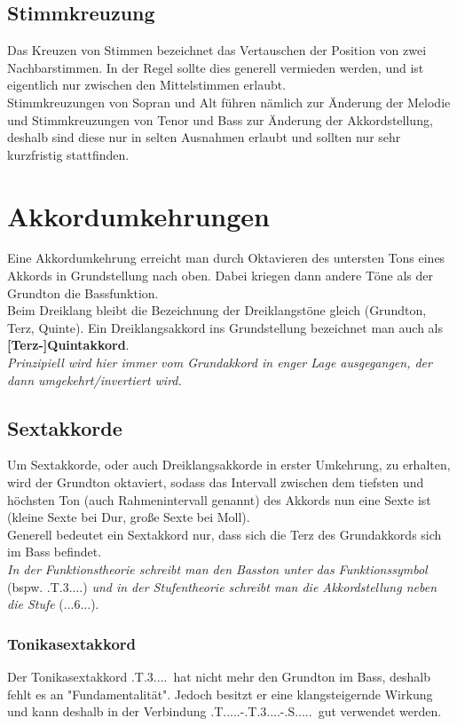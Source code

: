 \documentclass[a4paper]{article}
\newcommand{\dSS}[1]{\HH.\uppercase\expandafter{\romannumeral #1\relax}..6...} %
\newcommand{\T}{\HH.T.....}
\newcommand{\TS}{\HH.T.3....}
\renewcommand{\S}{\HH.S.....}
\begin{document}
	\subsection{Stimmkreuzung}
	Das Kreuzen von Stimmen bezeichnet das Vertauschen der Position von zwei Nachbarstimmen. In der Regel sollte dies generell vermieden werden, und ist eigentlich nur zwischen den Mittelstimmen erlaubt. \\
	Stimmkreuzungen von Sopran und Alt führen nämlich zur Änderung der Melodie und Stimmkreuzungen von Tenor und Bass zur Änderung der Akkordstellung, deshalb sind diese nur in selten Ausnahmen erlaubt und sollten nur sehr kurzfristig stattfinden.
	
	\section{Akkordumkehrungen}
	Eine Akkordumkehrung erreicht man durch Oktavieren des untersten Tons eines Akkords in Grundstellung nach oben. Dabei kriegen dann andere Töne als der Grundton die Bassfunktion.\\
	Beim Dreiklang bleibt die Bezeichnung der Dreiklangstöne gleich (Grundton, Terz, Quinte). Ein Dreiklangsakkord ins Grundstellung bezeichnet man auch als \textbf{[Terz-]Quintakkord}.\\
	\textit{Prinzipiell wird hier immer vom Grundakkord in enger Lage ausgegangen, der dann umgekehrt/invertiert wird.}
	
	\subsection{Sextakkorde}
	Um Sextakkorde, oder auch Dreiklangsakkorde in erster Umkehrung, zu erhalten, wird der Grundton oktaviert, sodass das Intervall zwischen dem tiefsten und höchsten Ton (auch Rahmenintervall genannt) des Akkords nun eine Sexte ist (kleine Sexte bei Dur, große Sexte bei Moll).\\
	Generell bedeutet ein Sextakkord nur, dass sich die Terz des Grundakkords sich im Bass befindet.\\
	\textit{In der Funktionstheorie schreibt man den Basston unter das Funktionssymbol} (bspw. \TS) \textit{und in der Stufentheorie schreibt man die Akkordstellung neben die Stufe} (\dSS{1}).
	
	\subsubsection{Tonikasextakkord}
	Der Tonikasextakkord \TS\ hat nicht mehr den Grundton im Bass, deshalb fehlt es an "Fundamentalität". Jedoch besitzt er eine klangsteigernde Wirkung und kann deshalb in der Verbindung \T-\TS-\S\ gut verwendet werden.
	
\end{document}
